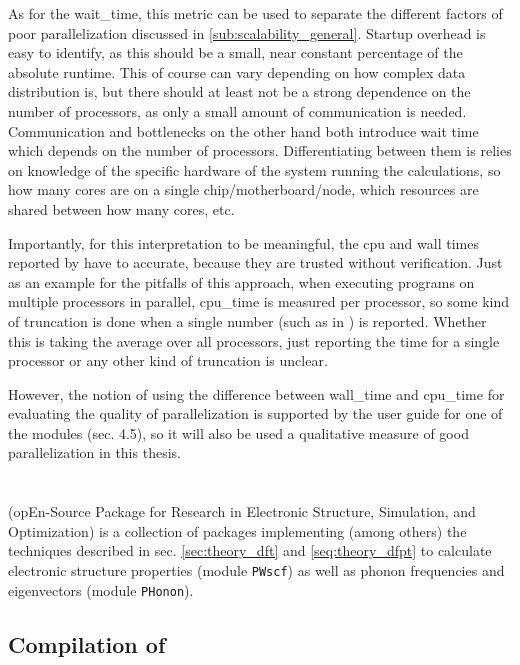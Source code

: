 \documentclass[main.tex]{subfiles}
\begin{document}
As for the \gls{wait_time}, this metric can be used to separate the different factors of poor parallelization discussed in \ref{sub:scalability_general}.
Startup overhead is easy to identify, as this should be a small, near constant percentage of the absolute runtime.
This of course can vary depending on how complex data distribution is, but there should at least not be a strong dependence on the number of processors, as only a small amount of communication is needed.
Communication and bottlenecks on the other hand both introduce wait time which depends on the number of processors.
Differentiating between them is relies on knowledge of the specific hardware of the system running the calculations, so how many cores are on a single chip/motherboard/node, which resources are shared between how many cores, etc.

Importantly, for this interpretation to be meaningful, the cpu and wall times reported by \QE have to accurate, because they are trusted without verification.
Just as an example for the pitfalls of this approach, when executing programs on multiple processors in parallel, \gls{cpu_time} is measured per processor, so some kind of truncation is done when a single number (such as in \QE) is reported.
Whether this is taking the average over all processors, just reporting the time for a single processor or any other kind of truncation is unclear.

However, the notion of using the difference between \gls{wall_time} and \gls{cpu_time} for evaluating the quality of parallelization is supported by the user guide for one of the \QE modules \cite{noauthor_pwscf_nodate} (sec. 4.5), so it will also be used a qualitative measure of good parallelization in this thesis.

\section{\QE}\label{sec:qe}

\QE (opEn-Source Package for Research in Electronic Structure, Simulation, and Optimization) \cite{giannozzi_quantum_2009,giannozzi_advanced_2017} is a collection of packages implementing (among others) the techniques described in sec. \ref{sec:theory_dft} and \ref{seq:theory_dfpt} to calculate electronic structure properties (module \texttt{PWscf}) as well as phonon frequencies and eigenvectors (module \texttt{PHonon}).

\subsection{Compilation of \QE}\label{sub:qe_compilation}
\end{document}
